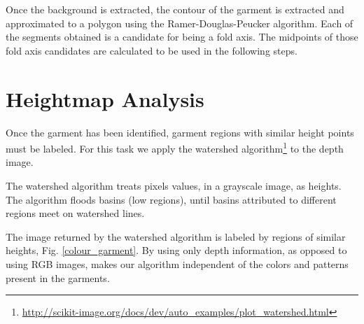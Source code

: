 Once the background is extracted, the contour of the garment is extracted and approximated to a polygon using the Ramer-Douglas-Peucker algorithm. Each of the segments obtained is a candidate for being a fold axis. The midpoints of those fold axis candidates are calculated to be used in the following steps.


\section{Heightmap Analysis}

Once the garment has been identified, garment regions with similar height points must be labeled. For this task we apply the watershed algorithm\footnote{\url{http://scikit-image.org/docs/dev/auto_examples/plot_watershed.html}} to the depth image. 

The watershed algorithm treats pixels values, in a grayscale image, as heights. The algorithm floods basins (low regions), until basins attributed to different regions meet on watershed lines. 

%
%

The image returned by the watershed algorithm is labeled by regions of similar heights, Fig. \ref{colour_garment}. By using only depth information, as opposed to using RGB images, makes our algorithm independent of the colors and patterns present in the garments.

